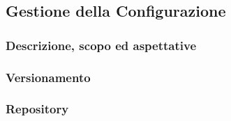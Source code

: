 \subsection{Gestione della Configurazione}

\subsubsection{Descrizione, scopo ed aspettative}

\subsubsection{Versionamento}

\subsubsection{Repository}


